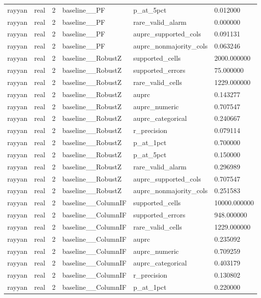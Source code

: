 \begin{tabular}{llllll}
rayyan & real & 2 & baseline\_\_PF & p\_at\_5pct & 0.012000 \\
rayyan & real & 2 & baseline\_\_PF & rare\_valid\_alarm & 0.000000 \\
rayyan & real & 2 & baseline\_\_PF & auprc\_supported\_cols & 0.091131 \\
rayyan & real & 2 & baseline\_\_PF & auprc\_nonmajority\_cols & 0.063246 \\
rayyan & real & 2 & baseline\_\_RobustZ & supported\_cells & 2000.000000 \\
rayyan & real & 2 & baseline\_\_RobustZ & supported\_errors & 75.000000 \\
rayyan & real & 2 & baseline\_\_RobustZ & rare\_valid\_cells & 1229.000000 \\
rayyan & real & 2 & baseline\_\_RobustZ & auprc & 0.143277 \\
rayyan & real & 2 & baseline\_\_RobustZ & auprc\_numeric & 0.707547 \\
rayyan & real & 2 & baseline\_\_RobustZ & auprc\_categorical & 0.240667 \\
rayyan & real & 2 & baseline\_\_RobustZ & r\_precision & 0.079114 \\
rayyan & real & 2 & baseline\_\_RobustZ & p\_at\_1pct & 0.700000 \\
rayyan & real & 2 & baseline\_\_RobustZ & p\_at\_5pct & 0.150000 \\
rayyan & real & 2 & baseline\_\_RobustZ & rare\_valid\_alarm & 0.296989 \\
rayyan & real & 2 & baseline\_\_RobustZ & auprc\_supported\_cols & 0.707547 \\
rayyan & real & 2 & baseline\_\_RobustZ & auprc\_nonmajority\_cols & 0.251583 \\
rayyan & real & 2 & baseline\_\_ColumnIF & supported\_cells & 10000.000000 \\
rayyan & real & 2 & baseline\_\_ColumnIF & supported\_errors & 948.000000 \\
rayyan & real & 2 & baseline\_\_ColumnIF & rare\_valid\_cells & 1229.000000 \\
rayyan & real & 2 & baseline\_\_ColumnIF & auprc & 0.235092 \\
rayyan & real & 2 & baseline\_\_ColumnIF & auprc\_numeric & 0.709259 \\
rayyan & real & 2 & baseline\_\_ColumnIF & auprc\_categorical & 0.403179 \\
rayyan & real & 2 & baseline\_\_ColumnIF & r\_precision & 0.130802 \\
rayyan & real & 2 & baseline\_\_ColumnIF & p\_at\_1pct & 0.220000 \\

\end{tabular}
